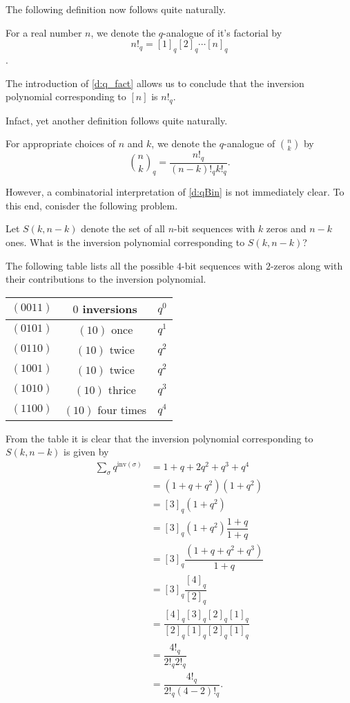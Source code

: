 The following definition now follows quite naturally.
\begin{definition}
For a real number $n$, we denote the $q$-analogue of it's factorial by 
\[n!_q=[1]_q[2]_q\cdots [n]_q\].
\label{d:q_fact}
\end{definition}
\begin{remark}
The introduction of \cref{d:q_fact} allows us to conclude that the inversion polynomial corresponding to $[n]$ is $n!_q$. 
\end{remark}
Infact, yet another definition follows quite naturally.
\begin{definition}
    For appropriate choices of $n$ and $k$, we denote the $q$-analogue of $\binom{n}{k}$ by 
    \[
    \binom{n}{k}_q = \dfrac{n!_q}{(n-k)!_q k!_q}.
    \]
    \label{d:qBin}
\end{definition}
However, a combinatorial interpretation of \cref{d:qBin} is not immediately clear. To this end, conisder the following problem.
\begin{question}
Let $S(k,n-k)$ denote the set of all $n$-bit sequences with $k$ zeros and $n-k$ ones. What is the inversion polynomial corresponding to $S(k,n-k)$?
\end{question}
The following table lists all the possible $4$-bit sequences with $2$-zeros along with their contributions to the inversion polynomial.
\begin{center}
	\begin{tabular}{|c|c|c|}
		\hline
		$(0011)$ & $0$ inversions & $q^0$ \\
		\hline
		$(0101)$ & $(10)$ once & $q^1$ \\
		\hline
		$(0110)$ & $(10)$ twice & $q^2$ \\
		\hline
		$(1001)$ & $(10)$ twice & $q^2$ \\
		\hline
		$(1010)$ & $(10)$ thrice & $q^3$ \\
		\hline
		$(1100)$ & $(10)$ four times & $q^4$ \\
		\hline
	\end{tabular}
\end{center}
\raggedbottom
From the table it is clear that the inversion polynomial corresponding to $S(k,n-k)$ is given by
\begin{align*}
	\sum_{\sigma}q^{\text{inv}(\sigma)} &= 1+q+2q^2+q^3+q^4 \\
					    &= (1+q+q^2)(1+q^2) \\
					    &= [3]_q (1+q^2) \\
					    &= [3]_q (1+q^2)\dfrac{1+q}{1+q} \\
					    &= [3]_q \dfrac{(1+q+q^2+q^3)}{1+q} \\
					    &= [3]_q \dfrac{[4]_q}{[2]_q} \\
					    &= \dfrac{[4]_q[3]_q[2]_q[1]_q}{[2]_q[1]_q[2]_q[1]_q} \\
					    &= \dfrac{4!_q}{2!_q2!_q}\\
					    &= \dfrac{4!_q}{2!_q(4-2)!_q}.
\end{align*}
